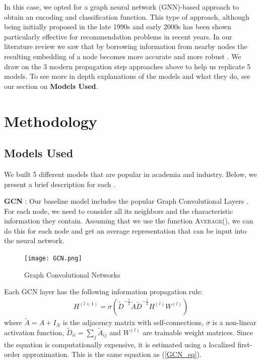\documentclass[sigconf, nonacm]{acmart}
\begin{document}
In this case, we opted for a graph neural network (GNN)-based approach to obtain an encoding and classification function. This type of approach, although being initially proposed in the late 1990s and early 2000s \cite{Alessandro1997} has been shown particularly effective for recommendation problems \cite{Ruining2018} in recent years. In our literature review we saw that by borrowing information from nearby nodes the resulting embedding of a node becomes more accurate and more robust \cite{Ankit2019}. We draw on the 3 modern propagation step approaches above to help us replicate 5 models. To see more in depth explanations of the models and what they do, see our section on \textbf{Models Used}.  

\section*{Methodology}

\subsection*{Models Used} 
We built 5 different models that are popular in academia and industry. Below, we present a brief description for each .

\textbf{\textsc{GCN}} : Our baseline model includes the popular Graph Convolutional Layers \cite{Kipf&Welling2017}. For each node, we need to consider all its neighbors and the characteristic information they contain. Assuming that we use the function \textsc{Average()}, we can do this for each node and get an average representation that can be input into the neural network.

\begin{figure}[htp]
    \centering
    \texttt{[image: GCN.png]}
    \caption{Graph Convolutional Networks \cite{Kipf&Welling2017}}
    \label{fig:GCN}
\end{figure}

Each \textsc{GCN} layer has the following information propagation rule:
\begin{align}
    H^{\left(l+1 \right)} = \sigma \left(\tilde D^{-\frac{1}{2}} \tilde A \tilde D^{-\frac{1}{2}} H^{(l)} W^{(l)} \right)
\end{align}
where $\tilde A = A + I_N$ is the adjacency matrix with self-connections, $\sigma$ is a non-linear activation function, $\tilde D_{ii} = \sum_j \tilde A_{ij}$ and $W^{(l)}$ are trainable weight matrices. Since the equation is computationally expensive, it is estimated using a localized first-order approximation. This is the same equation as (\ref{GCN_eq}).
\end{document}
